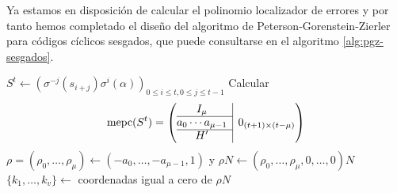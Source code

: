 Ya estamos en disposición de calcular el polinomio localizador de errores y por tanto hemos completado el diseño del algoritmo de Peterson-Gorenstein-Zierler para códigos cíclicos sesgados, que puede consultarse en el algoritmo \ref{alg:pgz-sesgados}.

\begin{Ualgorithm}[htbp]
  \small
  \DontPrintSemicolon
  \(S^t \longleftarrow \left(\sigma^{-j}(s_{i+j})\sigma^i(\alpha)\right)_{0 \leq i \leq t, 0 \leq j \leq t -1}\)\;
  Calcular
  \[
    \operatorname{mepc}(S^t) = \left( \begin{array}{@{}c|c@{}}
      I_{\mu} & \multirow{3}{*}{\(0_{(t+ 1)\times (t - \mu)}\)} \\\cline{1-1}
      a_0 \cdots a_{\mu -1 } & \\\cline{1-1}
      H' &
    \end{array}\right)
  \]\label{algl:pgz-sesgados-mpec-St}\vspace*{-1.5em}\;%
  \(\rho = (\rho_0, \dots, \rho_{\mu}) \longleftarrow (-a_0, \dots, -a_{\mu-1}, 1)\) y \(\rho N \longleftarrow (\rho_0, \dots, \rho_{\mu}, 0, \dots, 0)N\)\;\label{algl:pgz-sesgados-rho}
  \(\{k_1, \dots, k_v\} \longleftarrow \) coordenadas igual a cero de \(\rho N\)\;\label{algl:pgz-sesgados-pos-error}
\end{Ualgorithm}
